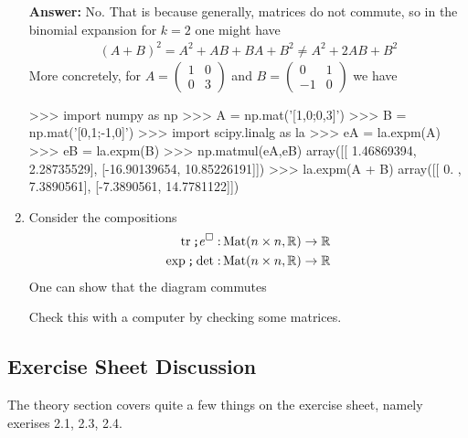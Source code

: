 \begin{enumerate}
    \textbf{Answer:} No. That is because generally, matrices do not commute, so in the binomial expansion for $k = 2$ one might have
    \begin{align*}
      {(A+B)}^{2} = A^{2} + AB + BA + B^{2} \neq A^{2} + 2AB + B^{2}
    \end{align*}
    More concretely, for $A = \begin{pmatrix}
    1 & 0\\
    0& 3
    \end{pmatrix}$ and $B = \begin{pmatrix}
    0 & 1\\
    -1 & 0
    \end{pmatrix}$ we have
    \vspace{1\baselineskip} 
    \begin{python}
>>> import numpy as np
>>> A = np.mat('[1,0;0,3]')
>>> B = np.mat('[0,1;-1,0]')
>>> import scipy.linalg as la
>>> eA = la.expm(A)
>>> eB = la.expm(B)
>>> np.matmul(eA,eB)
array([[  1.46869394,   2.28735529],
       [-16.90139654,  10.85226191]])
>>> la.expm(A + B)
array([[ 0.       ,  7.3890561],
       [-7.3890561, 14.7781122]])
    \end{python}
  \item Consider the compositions
    \begin{align*}
      \operatorname{tr} \texttt{;} e^{\square}: &\operatorname{Mat}(n \times n,\mathbb{R}) \to \mathbb{R}
      \\
      \exp \texttt{;} \det: &\operatorname{Mat}(n \times n,\mathbb{R}) \to \mathbb{R}
    \end{align*}
    One can show that the diagram commutes
    \begin{center}
    \end{center}
    Check this with a computer by checking some matrices.
\end{enumerate}


\subsection{Exercise Sheet Discussion}
The theory section covers quite a few things on the exercise sheet, namely exerises 2.1, 2.3, 2.4. 

